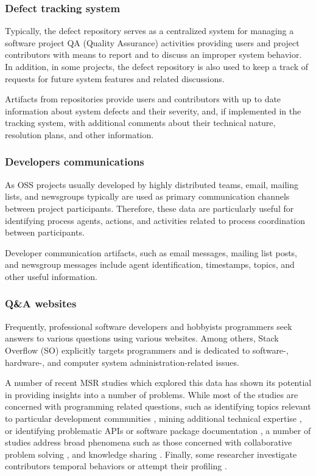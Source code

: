 \subsubsection{Defect tracking system}
Typically, the defect repository serves as a centralized system for managing a software project QA (Quality Assurance) activities
providing users and project contributors with means to report and to discuss an improper system behavior.
In addition, in some projects, the defect repository is also used to keep a track of requests for future system features and related
discussions.

Artifacts from repositories provide users and contributors with up to date information about system defects and their severity, and, 
if implemented in the tracking system, with additional comments about their technical nature, resolution plans, and other information. 

\subsubsection{Developers communications}
As OSS projects usually developed by highly distributed teams, email, mailing lists, and newsgroups typically are 
used as primary communication channels between project participants. Therefore, these data are particularly useful for
identifying process agents, actions,  and activities related to process coordination between participants. 

Developer communication artifacts, such as email messages, mailing list posts, and newsgroup messages include agent identification, 
timestamps, topics, and other useful information. 

\subsubsection{Q\&A websites}
Frequently, professional software developers and hobbyists programmers seek answers to various questions using various websites. 
Among others, Stack Overﬂow (SO) explicitly targets programmers and is dedicated to software-, hardware-, and computer system 
administration-related issues.

A number of recent MSR studies which explored this data has shown its potential in providing insights into a number of problems.
While most of the studies are concerned with programming related questions, such as identifying topics relevant to particular 
development communities \cite{kartik:msr14}, mining additional technical expertise \cite{VenkataramaniGAMB13} \cite{SaxeMG13}, 
or identifying problematic APIs \cite{KavalerPGCDF13} \cite{Linares2013Exploratory} or software package documentation 
\cite{Campbell2013Deficient}, 
a number of studies address broad phenomena such as those concerned with collaborative problem solving 
\cite{Tausczik2014Collaborative}, and knowledge sharing \cite{VasilescuCSCW14} \cite{Schenk2013Geo}. 
Finally, some researcher investigate contributors temporal behaviors \cite{Bosu2013Building} or attempt their profiling 
\cite{GinscaP13}.

